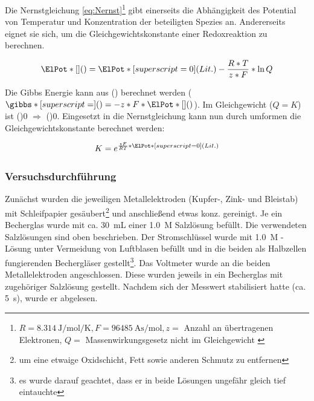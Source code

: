 \documentclass{article}
\begin{document}
      Die Nernstgleichung \eqref{eq:Nernst}\footnote{$R = \SI[mode=text]{8.314}{\joule\per\mole\per\kelvin}, F = \SI[mode=text]{96485}{\ampere\second\per\mole}, z = $ Anzahl an übertragenen Elektronen, $Q = $ Massenwirkungsgesetz nicht im Gleichgewicht \cite{PhysicalChemistryAtkings}} gibt einerseits die Abhängigkeit des Potential von Temperatur und Konzentration der beteiligten Spezies an. Andererseits eignet sie sich, um die Gleichgewichtskonstante einer Redoxreaktion zu berechnen. 
        
      \begin{equation}
        \ElPot*[](){} = \ElPot*[superscript=0](Lit.){} - \frac{R * T}{z * F} * \ln Q \label{eq:Nernst}
      \end{equation}
      
      Die Gibbs Energie kann aus \ElPot*[](){} berechnet werden ($\gibbs*[superscript=](){} = - z * F * \ElPot*[](){}$). Im Gleichgewicht ($Q = K$) ist \gibbs[superscript=](){0} $\Rightarrow$ \ElPot[](){0}. Eingesetzt in die Nernstgleichung kann nun durch umformen die Gleichgewichtskonstante berechnet werden:
      
      \begin{equation}
        K = e^{\frac{z F}{R T} * \ElPot*[superscript=0](Lit.){}} \label{eq:Gleichgewichtskonstante}
      \end{equation}
      
      \subsubsection{Versuchsdurchführung} \label{sec:VersuchZellen}
        
        Zunächst wurden die jeweiligen Metallelektroden (Kupfer-, Zink- und Bleistab) mit Schleifpapier gesäubert\footnote{um eine etwaige Oxidschicht, Fett sowie anderen Schmutz zu entfernen} und anschließend etwas konz.  gereinigt. Je ein Becherglas wurde mit ca. \SI[mode=text]{30}{\milli\liter} einer \SI[mode=text]{1.0}{M} Salzlösung befüllt. Die verwendeten Salzlösungen sind oben beschrieben. Der Stromschlüssel wurde mit \SI[mode=text]{1.0}{M} -Lösung unter Vermeidung von Luftblasen befüllt und in die beiden als Halbzellen fungierenden Bechergläser gestellt\footnote{es wurde darauf geachtet, dass er in beide Lösungen ungefähr gleich tief eintauchte}. Das Voltmeter wurde an die beiden Metallelektroden angeschlossen. Diese wurden jeweils in ein Becherglas mit zugehöriger Salzlösung gestellt. Nachdem sich der Messwert stabilisiert hatte (ca. \SI[mode=text]{5}{\second}), wurde er abgelesen. 
        
\end{document}
